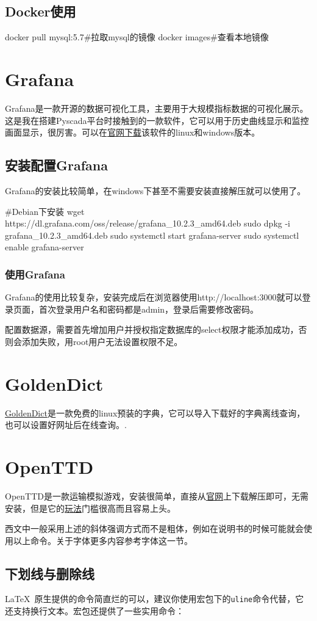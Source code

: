 \subsection{Docker使用}
\begin{shell}
docker pull mysql:5.7#拉取mysql的镜像
docker images#查看本地镜像
\end{shell}
\section{Grafana}
Grafana是一款开源的数据可视化工具，主要用于大规模指标数据的可视化展示。这是我在搭建Pyscada平台时接触到的一款软件，它可以用于历史曲线显示和监控画面显示，很厉害。可以在\href{https://grafana.com/grafana/download?platform=windows}{官网下载}该软件的linux和windows版本。
\subsection{安装配置Grafana}
Grafana的安装比较简单，在windows下甚至不需要安装直接解压就可以使用了。
\begin{shell}
#Debian下安装
wget https://dl.grafana.com/oss/release/grafana_10.2.3_amd64.deb
sudo dpkg -i grafana_10.2.3_amd64.deb
sudo systemctl start grafana-server
sudo systemctl enable grafana-server
\end{shell}
\subsubsection{使用Grafana}
Grafana的使用比较复杂，安装完成后在浏览器使用http://localhost:3000就可以登录页面，首次登录用户名和密码都是admin，登录后需要修改密码。

配置数据源，需要首先增加用户并授权指定数据库的select权限才能添加成功，否则会添加失败，用root用户无法设置权限不足。





\section{GoldenDict}
\href{https://blog.csdn.net/networkhunter/article/details/117127021?spm=1001.2014.3001.5506}{GoldenDict}是一款免费的linux预装的字典，它可以导入下载好的字典离线查询，也可以设置好网址后在线查询。.
\section{OpenTTD}
OpenTTD是一款运输模拟游戏，安装很简单，直接从\href{https://www.openttd.org/}{官网}上下载解压即可，无需安装，但是它的\href{https://wiki.openttd.org/zh/Main Page}{玩法}门槛很高而且容易上头。

西文中一般采用上述的斜体强调方式而不是粗体，例如在说明书的时候可能就会使用以上命令。关于字体更多内容参考字体这一节。

\subsection{下划线与删除线}
\LaTeX\ 原生提供的命令简直烂的可以，建议你使用宏包下的\texttt{uline}命令代替，它还支持换行文本。宏包还提供了一些实用命令：
